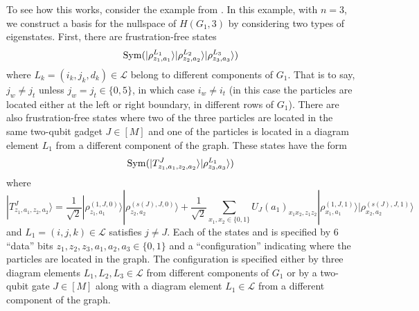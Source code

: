 \documentclass[../thesis-main/thesis-main]{subfiles}
\begin{document}
To see how this works, consider the example from . In this example, with $n=3$, we construct a basis for the nullspace of $H(G_{1},3)$ by considering two types of eigenstates. First, there are frustration-free states
\begin{equation}
\operatorname{Sym}(|\rho_{z_{1},a_{1}}^{L_{1}}\rangle|\rho_{z_{2},a_{2}}^{L_{2}}\rangle|\rho_{z_{3},a_{3}}^{L_{3}}\rangle)
\label{eq:twopart_states1}
\end{equation}
where $L_{k}=(i_{k},j_{k},d_{k})\in\mathcal{L}$ belong to different components of $G_{1}$. That is to say, $j_{w}\neq j_{t}$ unless $j_{w}=j_{t}\in\{0,5\}$, in which case $i_{w}\neq i_{t}$ (in this case the particles are located either at the left or right boundary, in different rows of $G_{1}$). There are also frustration-free states where two of the three particles are located in the same two-qubit gadget $J\in[M]$ and one of the particles is located in a diagram element $L_{1}$ from a different component of the graph. These states have the form
\begin{equation}
\operatorname{Sym}(|T_{z_{1},a_{1},z_{2},a_{2}}^{J}\rangle|\rho_{z_{3},a_{3}}^{L_{1}}\rangle)
\label{eq:twopart_states2}
\end{equation}
where 
\begin{equation}
|T_{z_{1},a_{1},z_{2},a_{2}}^{J}\rangle=\frac{1}{\sqrt{2}}|\rho_{z_{1},a_{1}}^{(1,J,0)}\rangle|\rho_{z_{2},a_{2}}^{(s(J),J,0)}\rangle+\frac{1}{\sqrt{2}}\sum_{x_{1},x_{2}\in\{0,1\}}U_{J}(a_{1})_{x_{1}x_{2},z_{1}z_{2}}|\rho_{x_{1},a_{1}}^{(1,J,1)}\rangle|\rho_{x_{2},a_{2}}^{(s(J),J,1)}\rangle\label{eq:T_state}
\end{equation}
and $L_{1}=(i,j,k)\in\mathcal{L}$ satisfies $j\neq J$. Each of the states  and  is specified by $6$ ``data'' bits $z_{1},z_{2},z_{3},a_{1},a_{2},a_{3}\in\{0,1\}$ and a ``configuration'' indicating where the particles are located in the graph. The configuration is specified either by three diagram elements $L_{1},L_{2},L_{3}\in\mathcal{L}$ from different components of $G_{1}$ or by a two-qubit gate $J\in [M]$ along with a diagram element $L_{1}\in\mathcal{L}$ from a different component of the graph.
\end{document}
